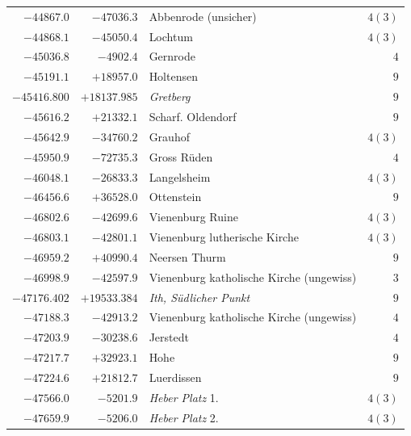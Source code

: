 \begin{center}
\begin{tabular}{r|r|p{170pt}|r}
\(-44867.0\)&\(-47036.3\)&Abbenrode (unsicher)&\(4 (3)\)\\
\(-44868.1\)&\(-45050.4\)&Lochtum&\(4 (3)\)\\
\(-45036.8\)&\(-4902.4\)&Gernrode&\(4\)\\
\(-45191.1\)&\(+18957.0\)&Holtensen&\(9\)\\
\(-45416.800\)&\(+18137.985\)&\textit{Gretberg}&\(9\)\\
\(-45616.2\)&\(+21332.1\)&Scharf. Oldendorf&\(9\)\\
\(-45642.9\)&\(-34760.2\)&Grauhof&\(4 (3)\)\\
\(-45950.9\)&\(-72735.3\)&Gross Rüden&\(4\)\\
\(-46048.1\)&\(-26833.3\)&Langelsheim&\(4 (3)\)\\
\(-46456.6\)&\(+36528.0\)&Ottenstein&\(9\)\\
\(-46802.6\)&\(-42699.6\)&Vienenburg Ruine&\(4 (3)\)\\
\(-46803.1\)&\(-42801.1\)&Vienenburg lutherische Kirche&\(4 (3)\)\\
\(-46959.2\)&\(+40990.4\)&Neersen Thurm&\(9\)\\
\(-46998.9\)&\(-42597.9\)&Vienenburg katholische Kirche (ungewiss)&\(3\)\\
\(-47176.402\)&\(+19533.384\)&\textit{Ith, Südlicher Punkt}&\(9\)\\
\(-47188.3\)&\(-42913.2\)&Vienenburg katholische Kirche (ungewiss)&\(4\)\\
\(-47203.9\)&\(-30238.6\)&Jerstedt&\(4\)\\
\(-47217.7\)&\(+32923.1\)&Hohe&\(9\)\\
\(-47224.6\)&\(+21812.7\)&Luerdissen&\(9\)\\
\(-47566.0\)&\(-5201.9\)&\textit{Heber Platz} 1.&\(4 (3)\)\\
\(-47659.9\)&\(-5206.0\)&\textit{Heber Platz} 2.&\(4 (3)\)\\
\hline\end{tabular}\endgroup\end{center}
